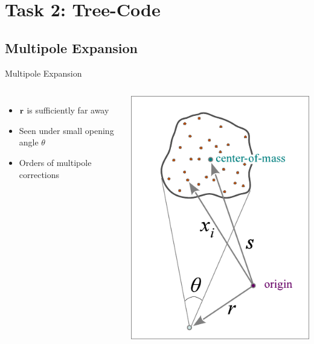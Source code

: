 \section{Task 2: Tree-Code}

\subsection{Multipole Expansion}
\begin{frame}{Multipole Expansion}
	\begin{columns}
		\begin{itemize}
			\item $\vb{r}$ is sufficiently far
			      away
			\item  Seen under small opening angle
			      $\theta$
			\item  Orders of multipole corrections
		\end{itemize}
		\includegraphics[width=\linewidth]{figures/multipole.png}
	\end{columns}
\end{frame}

